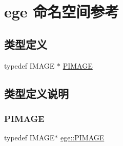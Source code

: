 \hypertarget{namespaceege}{}\section{ege 命名空间参考}
\label{namespaceege}
\subsection*{类型定义}
\begin{DoxyCompactItemize}
\item 
typedef I\+M\+A\+GE $\ast$ \hyperlink{namespaceege_a72e07306fee47bc08f1baf842cb681fb}{P\+I\+M\+A\+GE}
\end{DoxyCompactItemize}


\subsection{类型定义说明}
\mbox{\label{namespaceege_a72e07306fee47bc08f1baf842cb681fb}} 
\subsubsection{\texorpdfstring{P\+I\+M\+A\+GE}{PIMAGE}}
{\footnotesize\ttfamily typedef I\+M\+A\+GE$\ast$ \hyperlink{namespaceege_a72e07306fee47bc08f1baf842cb681fb}{ege\+::\+P\+I\+M\+A\+GE}}

